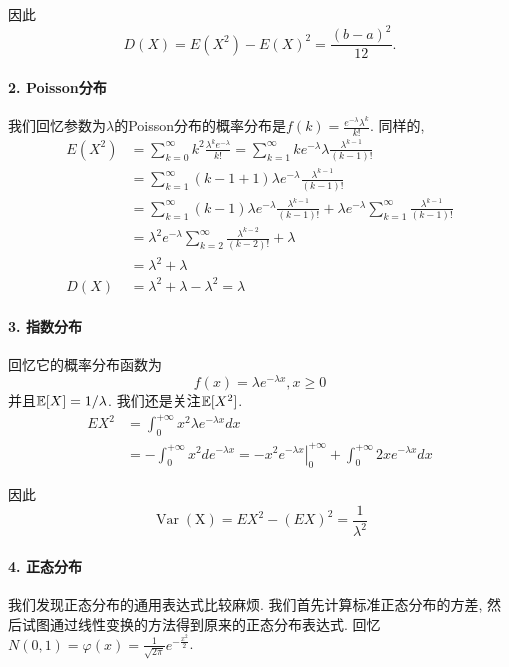     因此
    $$
    D(X)=E\left(X^2\right)-E(X)^2=\frac{(b-a)^2}{12}.
    $$

    \paragraph{2. Poisson分布} 我们回忆参数为$\lambda$的Poisson分布的概率分布是$f(k )=\frac{e^{-\lambda} \lambda^k}{k !}$. 同样的, 
    $$
    \begin{aligned}
    E\left(X^2\right) & =\sum_{k=0}^{\infty} k^2 \frac{\lambda^k e^{-\lambda}}{k !}=\sum_{k=1}^{\infty} k e^{-\lambda} \lambda \frac{\lambda^{k-1}}{(k-1) !} \\
    & =\sum_{k=1}^{\infty}(k-1+1) \lambda e^{-\lambda} \frac{\lambda^{k-1}}{(k-1) !} \\
    & =\sum_{k=1}^{\infty}(k-1) \lambda e^{-\lambda} \frac{\lambda^{k-1}}{(k-1) !}+\lambda e^{-\lambda} \sum_{k=1}^{\infty} \frac{\lambda^{k-1}}{(k-1) !} \\
    & =\lambda^2 e^{-\lambda} \sum_{k=2}^{\infty} \frac{\lambda^{k-2}}{(k-2) !}+\lambda \\
    & =\lambda^2+\lambda \\
    D(X) & =\lambda^2+\lambda-\lambda^2=\lambda
    \end{aligned}
    $$

    \paragraph{3. 指数分布} 回忆它的概率分布函数为$$
    f(x)=\lambda e^{-\lambda x}, x \geq 0
    $$并且$\mathbb E[X]=1/\lambda$. 我们还是关注$\mathbb E[X^2]$. 
    $$
\begin{aligned}
E X^2 & =\int_0^{+\infty} x^2 \lambda e^{-\lambda x} d x \\
& =-\int_0^{+\infty} x^2 d e^{-\lambda x}=-\left.x^2 e^{-\lambda x}\right|_0 ^{+\infty}+\int_0^{+\infty} 2 x e^{-\lambda x} d x 
\end{aligned}
$$

因此
$$
\operatorname{Var}(\mathrm{X})=E X^2-(E X)^2=\frac{1}{\lambda^2}
$$

\paragraph{4. 正态分布} 我们发现正态分布的通用表达式比较麻烦. 我们首先计算标准正态分布的方差, 然后试图通过线性变换的方法得到原来的正态分布表达式. 回忆$N(0,1)=\varphi(x)=\frac{1}{\sqrt{2 \pi}} e^{-\frac{x^2}{2}}$. 

